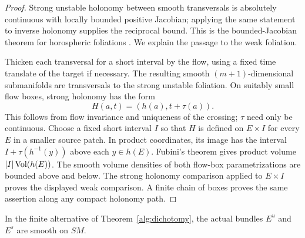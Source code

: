 \begin{proof}
Strong unstable holonomy between smooth transversals is absolutely
continuous with locally bounded positive Jacobian; applying the same
statement to inverse holonomy supplies the reciprocal bound.  This is
the bounded-Jacobian theorem for horospheric foliations
\cite[Appendix, Theorem~5.1 and Definition~3.3]{Ballmann1995}.
We explain the passage to the weak foliation.

Thicken each transversal for a short interval by the flow, using a fixed
time translate of the target if necessary.  The resulting smooth
$(m+1)$-dimensional submanifolds are transversals to the strong unstable
foliation.  On suitably small flow boxes, strong holonomy has the form
\[
 H(a,t)=(h(a),t+\tau(a)).
\]
This follows from flow invariance and uniqueness of the crossing;
$\tau$ need only be continuous.  Choose a fixed short interval $I$ so
that $H$ is defined on $E\times I$ for every $E$ in a smaller source
patch.  In product coordinates, its image has the interval
$I+\tau(h^{-1}(y))$ above each $y\in h(E)$.  Fubini's theorem gives
product volume $|I|\operatorname{Vol}(h(E))$.  The smooth volume densities of both
flow-box parametrizations are bounded above and below.  The strong
holonomy comparison applied to $E\times I$ proves the displayed weak
comparison.  A finite chain of boxes proves the same assertion along
any compact holonomy path.
\end{proof}

\begin{theorem}
\label{smooth:splitting}
In the finite alternative of Theorem~\ref{alg:dichotomy}, the actual
bundles $E^u$ and $E^s$ are smooth on $SM$.
\end{theorem}

